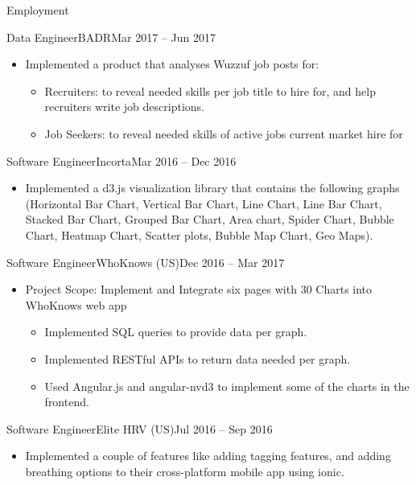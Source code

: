 \documentclass[]{ahmedamrcv_saudi}
\begin{document}
\begin{cvsection}{Employment}
		\begin{cvsubsection}{Data Engineer}{BADR}{Mar 2017 -- Jun 2017}
			\begin{itemize}
				\item Implemented a product that analyses Wuzzuf job posts for:
				\begin{itemize}
					\item Recruiters: to reveal needed skills per job title to hire for, and help recruiters write job descriptions.
					\item Job Seekers: to reveal needed skills of active jobs current market hire for
				\end{itemize}
			\end{itemize}
		\end{cvsubsection}

		\begin{cvsubsection}{Software Engineer}{Incorta}{Mar 2016 -- Dec 2016}
			\begin{itemize}
				\item Implemented a d3.js visualization library that contains the following graphs (Horizontal Bar Chart, Vertical Bar Chart, Line Chart, Line Bar Chart, Stacked Bar Chart, Grouped Bar Chart, Area chart, Spider Chart, Bubble Chart, Heatmap Chart, Scatter plots, Bubble Map Chart, Geo Maps).
			\end{itemize}
		\end{cvsubsection}


		\begin{cvsubsection}{Software Engineer}{WhoKnows (US)}{Dec 2016 -- Mar 2017}
			\begin{itemize}
				\item Project Scope: Implement and Integrate six pages with 30 Charts into WhoKnows web app
				\begin{itemize}
					\item Implemented SQL queries to provide data per graph.
					\item Implemented RESTful APIs to return data needed per graph.
					\item Used Angular.js and angular-nvd3 to implement some of the charts in the frontend.
				\end{itemize}
				
			\end{itemize}
		\end{cvsubsection}

		\begin{cvsubsection}{Software Engineer}{Elite HRV (US)}{Jul 2016 -- Sep 2016}
			\begin{itemize}
				\item Implemented a couple of features like adding tagging features, and adding breathing options to their cross-platform mobile app using ionic.
			\end{itemize}
		\end{cvsubsection}

	\end{cvsection}
	
\end{document}
